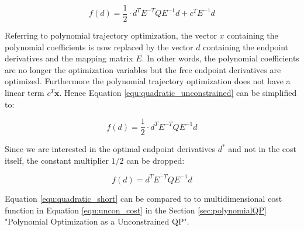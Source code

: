 \begin{equation}
 f(d)  = \frac{1}{2} \cdot d^T  E^{-T}  Q  E^{-1}  d + c^T  E^{-1} d
\label{equ:quadratic_unconstrained}
\end{equation}


Referring to polynomial trajectory optimization, the vector $x$ containing the polynomial coefficients is now replaced by the vector $d$ containing the endpoint derivatives and the mapping matrix $E$. In other words, the polynomial coefficients are no longer the optimization variables but the free endpoint derivatives are optimized. Furthermore the polynomial trajectory optimization does not have a linear term $c^T \mathbf{x}$. Hence Equation \ref{equ:quadratic_unconstrained} can be simplified to:  

\begin{equation}
 f(d)  = \frac{1}{2} \cdot d^T  E^{-T}  Q  E^{-1}  d 
\label{equ:quadratic_simple}
\end{equation}

Since we are interested in the optimal endpoint derivatives $d^*$ and not in the cost itself, the constant multiplier $1/2$ can be dropped:

\begin{equation}
 f(d)  = d^T  E^{-T}  Q  E^{-1}  d 
\label{equ:quadratic_short}
\end{equation}

Equation \ref{equ:quadratic_short} can be compared to to multidimensional cost function in Equation   \ref{equ:uncon_cost} in the Section \ref{sec:polynomialQP}  "Polynomial Optimization as a Unconstrained QP".












